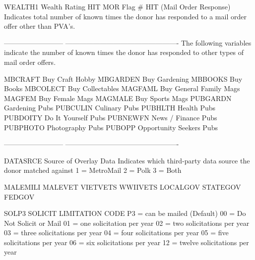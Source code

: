 \documentclass[
  11pt,
  a4paper,
  DIV=12,captions=tableheading,oneside,titlepage]{scrbook}
\let\oldverbatim\verbatim
\let\endoldverbatim\endverbatim
\renewenvironment{verbatim}{\footnotesize\oldverbatim}{\endoldverbatim}
\begin{document}
\begin{verbatim}
WEALTH1                     Wealth Rating
HIT                         MOR Flag # HIT (Mail Order Response)
                            Indicates total number of known times the donor has 
                            responded to a mail order offer other than PVA's.
                           
--------------------------  -------------------------------------------------
                            The following variables indicate the number of 
                            known times the donor has responded to other 
                            types of mail order offers.
                           
MBCRAFT                     Buy Craft Hobby
MBGARDEN                    Buy Gardening
MBBOOKS                     Buy Books
MBCOLECT                    Buy Collectables
MAGFAML                     Buy General Family Mags
MAGFEM                      Buy Female Mags
MAGMALE                     Buy Sports Mags
PUBGARDN                    Gardening Pubs
PUBCULIN                    Culinary Pubs
PUBHLTH                     Health Pubs
PUBDOITY                    Do It Yourself Pubs
PUBNEWFN                    News / Finance Pubs
PUBPHOTO                    Photography Pubs
PUBOPP                      Opportunity Seekers Pubs
                           
--------------------------  -------------------------------------------------
                           
DATASRCE                    Source of Overlay Data
                            Indicates which third-party data source the donor 
                            matched against
                            1 = MetroMail
                            2 = Polk
                            3 = Both
                           
MALEMILI                    % Males active in the Military
MALEVET                     % Males Veterans
VIETVETS                    % Vietnam Vets
WWIIVETS                    % WWII Vets
LOCALGOV                    % Employed by Local Gov
STATEGOV                    % Employed by State Gov
FEDGOV                      % Employed by Fed Gov
                           
SOLP3                       SOLICIT LIMITATION CODE P3
                               = can be mailed (Default)
                            00 = Do Not Solicit or Mail
                            01 = one solicitation per year
                            02 = two solicitations per year
                            03 = three solicitations per year
                            04 = four solicitations per year
                            05 = five solicitations per year
                            06 = six solicitations per year
                            12 = twelve solicitations per year
                           

\end{verbatim}
\end{document}
